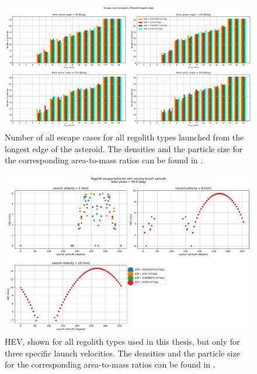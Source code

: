 \begin{figure}[htb]
\centering
\captionsetup{justification=centering}
\includegraphics[angle=90, width=\textwidth, height=\textheight, keepaspectratio=true]{longest_edge_perturbations/multiple_regolith_types/allPhases_escapeCases.pdf}
\caption{Number of all escape cases for all regolith types launched from the longest edge of the asteroid. The densities and the particle size for the corresponding area-to-mass ratios can be found in .}
\label{fig:longestEdge_allParticles_escape_hist}
\end{figure}
\FloatBarrier
\begin{figure}[htb]
\centering
\captionsetup{justification=centering}
\includegraphics[width=\textwidth, height=0.5\textheight, keepaspectratio=true]{longest_edge_perturbations/multiple_regolith_types/phase45_escapeHEV.pdf}
\caption{\gls{HEV}, shown for all regolith types used in this thesis, but only for three specific launch velocities. The densities and the particle size for the corresponding area-to-mass ratios can be found in .}
\label{fig:longestEdge_allParticles_escape_hev_solarPhase45}
\end{figure}
